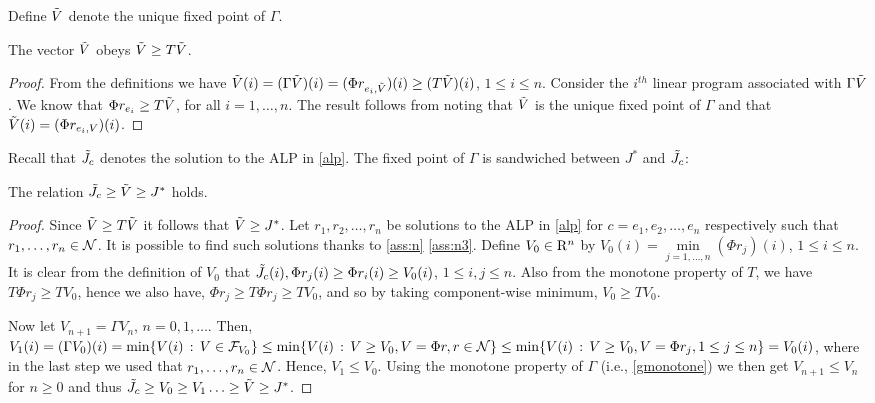\fi
Define $\tilde{V}$ denote the unique fixed point of $\Gamma$.
\begin{lemma}\label{gfp}
The vector $\tilde{V}$ obeys $\tilde{V}\geq T\tilde{V}$.
\end{lemma}
\begin{proof}
From the definitions we have $\tilde{V}(i) = (\Gamma \tilde{V})(i) = (\Phi r_{e_i,\tilde{V}})(i) \ge (T\tilde{V})(i)$, $1\le i \le n$.
Consider the $i^{th}$ linear program associated with $\Gamma \tilde{V}$. We know that $\Phi r_{e_i}\geq T \tilde{V}$, for all $i=1,\ldots, n$. The result follows from noting that $\tilde{V}$ is the unique fixed point of $\Gamma $ and that $\tilde{V}(i)=(\Phi r_{e_i,V})(i)$.
\fi
\end{proof}
Recall that $\tilde{J}_c$ denotes the solution to the ALP in \eqref{alp}.
The fixed point of $\Gamma$ is sandwiched between $J^*$ and $\tilde{J}_c$:
\begin{lemma}\label{relation1}
The relation $\tilde{J}_c\geq\tilde{V}\geq J^*$ holds.
\end{lemma}
\begin{proof}
Since $\tilde{V}\geq T\tilde{V}$ it follows that $\tilde{V}\geq J^*$. 
Let $r_1, r_2,\ldots, r_n$ be solutions to the ALP in \eqref{alp} for $c=e_1, e_2,\ldots,e_n$ respectively
such that $r_1,\dots,r_n\in \mathcal{N}$. It is possible to find such solutions thanks to \cref{ass:n} \eqref{ass:n3}.
Define $V_0\in \mathrm{R}^n$ by $V_0(i)=\underset{j=1,\ldots, n}{\min}(\Phi r_j)(i)$, $1\le i \le n$. 
It is clear from the definition of $V_0$ that $\tilde{J}_c(i), \Phi r_j(i) \geq\Phi r_i(i)\geq V_0(i)$, $1\le i,j \le n$. 
Also from the monotone property of $T$, we have $T\Phi r_j\geq T V_0$,
hence we also have,
$\Phi r_j\geq T\Phi r_j \geq T V_0$, 
and so by taking component-wise minimum,
$V_0 \geq T V_0$.

Now let $V_{n+1} = \Gamma V_n$, $n=0,1,\dots$. Then, $V_1(i) = (\Gamma V_0)(i) = \min\{ V(i) \,:\, V\in \mathcal{F}_{V_0} \}
\le \min\{ V(i) \,:\, V\ge V_0, V = \Phi r, r\in \mathcal{N} \} \le \min\{ V(i)\,:\, V \ge V_0, V = \Phi r_j, 1\le j \le n \} = V_0(i)$,
where in the last step we used that $r_1,\dots,r_n \in \mathcal{N}$.
Hence, $V_1 \le V_0$. Using the monotone property of $\Gamma$ (i.e., \cref{gmonotone})
we then get $V_{n+1}\le V_n$ for $n\ge 0$ and thus 
$\tilde{J}_c\geq V_0\geq V_1\ldots\geq \tilde{V} \geq J^*$.
\end{proof}

